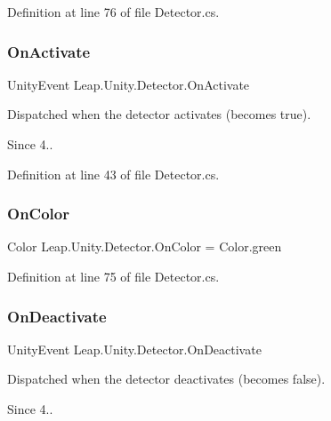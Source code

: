 Definition at line 76 of file Detector.\+cs.

\mbox{\label{class_leap_1_1_unity_1_1_detector_a55b5828df6cfa7321ccbf04dcf027ff9}} 
\subsubsection{\texorpdfstring{OnActivate}{OnActivate}}
{\footnotesize\ttfamily Unity\+Event Leap.\+Unity.\+Detector.\+On\+Activate}

Dispatched when the detector activates (becomes true). \begin{DoxySince}{Since}
4.. 
\end{DoxySince}


Definition at line 43 of file Detector.\+cs.

\mbox{\label{class_leap_1_1_unity_1_1_detector_ad922f873e3c07f9128d6438332e7b9c7}} 
\subsubsection{\texorpdfstring{OnColor}{OnColor}}
{\footnotesize\ttfamily Color Leap.\+Unity.\+Detector.\+On\+Color = Color.\+green\hspace{0.3cm}{\ttfamily [protected]}}



Definition at line 75 of file Detector.\+cs.

\mbox{\label{class_leap_1_1_unity_1_1_detector_a786623564f0d001aa6869bb136786822}} 
\subsubsection{\texorpdfstring{OnDeactivate}{OnDeactivate}}
{\footnotesize\ttfamily Unity\+Event Leap.\+Unity.\+Detector.\+On\+Deactivate}

Dispatched when the detector deactivates (becomes false). \begin{DoxySince}{Since}
4.. 
\end{DoxySince}


